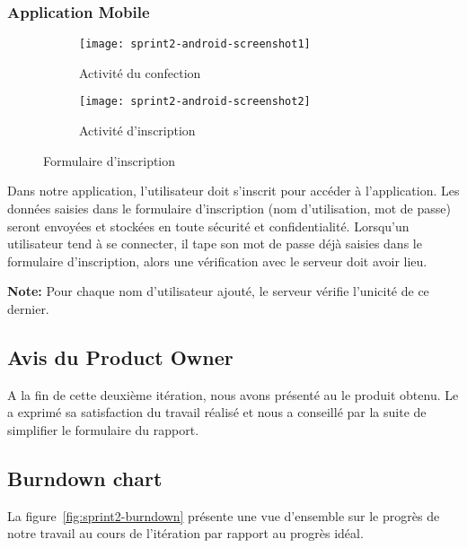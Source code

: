\subsubsection{Application Mobile }

\begin{figure}[H]
\centering
    \begin{subfigure}{.45\textwidth}
        \centering
        \centering
        \texttt{[image: sprint2-android-screenshot1]}
        \caption{Activité du confection}
\label{fig:sprint2-android-screenshot1}
    \end{subfigure}
    \begin{subfigure}{.45\textwidth}
        \centering
        \centering
        \texttt{[image: sprint2-android-screenshot2]}
        \caption{Activité d'inscription}
\label{fig:sprint2-android-screenshot2}
    \end{subfigure}
    \caption{Formulaire d'inscription}
\end{figure}

Dans notre application, l'utilisateur doit s'inscrit pour accéder à
l'application. Les données saisies dans le formulaire d'inscription (nom
d'utilisation, mot de passe) seront envoyées et stockées en toute sécurité et
confidentialité. Lorsqu'un utilisateur tend à se connecter, il tape son mot de
passe déjà saisies dans le formulaire d'inscription, alors une vérification
avec le serveur doit avoir lieu.

\textbf{Note:} Pour chaque nom d'utilisateur ajouté, le serveur vérifie
l'unicité de ce dernier.



\subsection{Avis du Product Owner}

A la fin de cette deuxième itération, nous avons présenté au  le produit obtenu. Le  a exprimé sa
satisfaction du travail réalisé et nous a conseillé par la suite de simplifier
le formulaire du rapport.

\subsection{Burndown chart}

La figure~\ref{fig:sprint2-burndown} présente une vue d'ensemble sur le progrès
de notre travail au cours de l'itération par rapport au progrès idéal.

